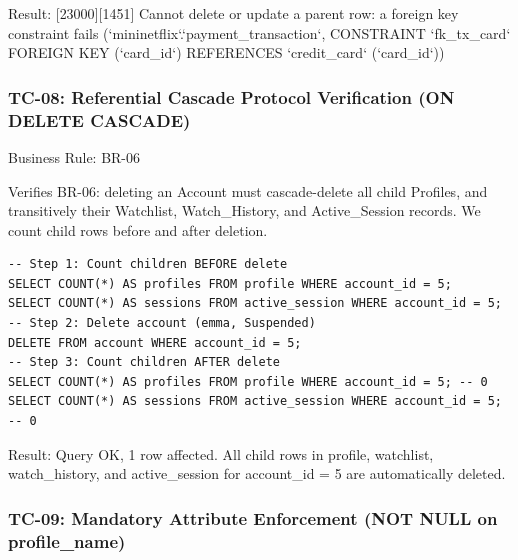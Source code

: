  \textbullet{} Result: {[}23000{]}{[}1451{]} Cannot delete or update a parent row: a foreign key constraint fails (`mininetflix`.`payment\_\allowbreak{}transaction`, CONSTRAINT `fk\_\allowbreak{}tx\_\allowbreak{}card` FOREIGN KEY (`card\_\allowbreak{}id`) REFERENCES `credit\_\allowbreak{}card` (`card\_\allowbreak{}id`))

\subsubsection{\texorpdfstring{\textbullet{} \textbf{TC-08: Referential Cascade Protocol Verification (ON DELETE CASCADE)}}{\textbullet{} TC-08: Referential Cascade Protocol Verification (ON DELETE CASCADE)}}\label{tc-08-referential-cascade-protocol-verification-on-delete-cascade}

Business Rule: BR-06

Verifies BR-06: deleting an Account must cascade-delete all child Profiles, and transitively their Watchlist, Watch\_\allowbreak{}History, and Active\_\allowbreak{}Session records. We count child rows before and after deletion.

\begin{lstlisting}[style=reportsql,title={Verification SQL}]
-- Step 1: Count children BEFORE delete
SELECT COUNT(*) AS profiles FROM profile WHERE account_id = 5;
SELECT COUNT(*) AS sessions FROM active_session WHERE account_id = 5;
-- Step 2: Delete account (emma, Suspended)
DELETE FROM account WHERE account_id = 5;
-- Step 3: Count children AFTER delete
SELECT COUNT(*) AS profiles FROM profile WHERE account_id = 5; -- 0
SELECT COUNT(*) AS sessions FROM active_session WHERE account_id = 5; -- 0
\end{lstlisting}



 \textbullet{} Result: Query OK, 1 row affected. All child rows in profile, watchlist, watch\_\allowbreak{}history, and active\_\allowbreak{}session for account\_\allowbreak{}id = 5 are automatically deleted.

\subsubsection{\texorpdfstring{\textbullet{} \textbf{TC-09: Mandatory Attribute Enforcement (NOT NULL on profile\_\allowbreak{}name)}}{\textbullet{} TC-09: Mandatory Attribute Enforcement (NOT NULL on profile\_\allowbreak{}name)}}\label{tc-09-mandatory-attribute-enforcement-not-null-on-profile_name}

